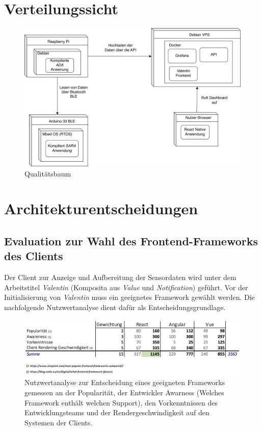 \documentclass[
]{article}
\begin{document}
\newpage
\section{Verteilungssicht}

\begin{figure}[H]
	\centering
	\includegraphics[width=170mm]{resources/Verteilungssicht_Deployment.png}
	\caption{Qualitätsbaum}
	\label{fig:Qualitätsbaum}
\end{figure}  

\section{Architekturentscheidungen}
\subsection{Evaluation zur Wahl des Frontend-Frameworks des Clients}

Der Client zur Anzeige und Aufbereitung der Sensordaten wird unter dem Arbeitstitel \textit{Valentin} (Komposita aus \textit{Value} und \textit{Notification}) geführt. Vor der Initialisierung von \textit{Valentin} muss ein geeignetes Framework gewählt werden. Die nachfolgende Nutzwertanalyse dient dafür als Entscheidungsgrundlage. 

\begin{figure}[H]
  \centering
  \includegraphics[width=1\textwidth]{./resources/techevaluationfe.png}
  \caption{Nutzwertanalyse zur Entscheidung eines geeigneten Frameworks gemessen an der Popularität, der Entwickler Awarness (Welches Framework enthält welchen Support), den Vorkenntnissen des Entwicklungsteams und der Rendergeschwindigkeit auf den Systemen der Clients.}
  \label{fig:deine_label}
\end{figure}
\end{document}
